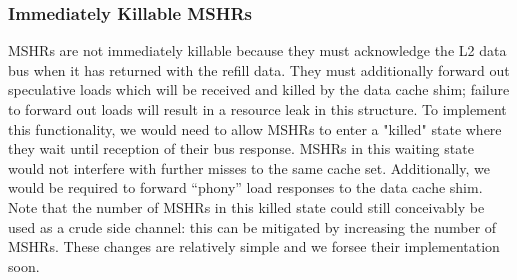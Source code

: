 \subsubsection{Immediately Killable MSHRs}
MSHRs are not immediately killable because they must acknowledge the L2 data bus when it has returned with the refill data. They must additionally forward out speculative loads which will be received and killed by the data cache shim; failure to forward out loads will result in a resource leak in this structure. To implement this functionality, we would need to allow MSHRs to enter a "killed" state where they wait until reception of their bus response. MSHRs in this waiting state would not interfere with further misses to the same cache set. Additionally, we would be required to forward ``phony'' load responses to the data cache shim. Note that the number of MSHRs in this killed state could still conceivably be used as a crude side channel: this can be mitigated by increasing the number of MSHRs. These changes are relatively simple and we forsee their implementation soon.
